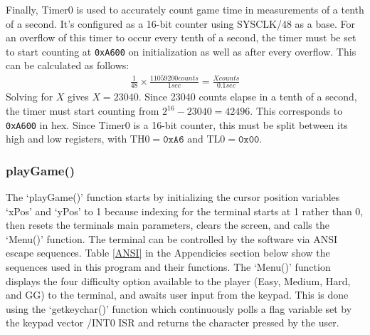 \documentclass[12pt]{article}
\begin{document}
Finally, Timer0 is used to accurately count game time in measurements of a tenth of a second. It's configured as a 16-bit counter using SYSCLK/48 as a base. For an overflow of this timer to occur every tenth of a second, the timer must be set to start counting at \texttt{0xA600} on initialization as well as after every overflow. This can be calculated as follows:
\begin{gather*}
	\frac{1}{48}\times \frac{11059200 \si{counts}}{\si{1}{sec}}=\frac{X\si{counts}}{0.1\si{sec}}
\end{gather*}
Solving for $X$ gives $X=23040$. Since 23040 counts elapse in a tenth of a second, the timer must start counting from $2^{16}-23040=42496$. This corresponds to \texttt{0xA600} in hex. Since Timer0 is a 16-bit counter, this must be split between its high and low registers, with $\mathrm{TH0}=\texttt{0xA6}$ and $\mathrm{TL0}=\texttt{0x00}$.

\subsubsection{playGame()}
The `playGame()' function starts by initializing the cursor position variables `xPos' and `yPos' to 1 because indexing for the terminal starts at 1 rather than 0, then resets the terminals main parameters, clears the screen, and calls the `Menu()' function. The terminal can be controlled by the software via ANSI escape sequences. Table \ref{ANSI} in the Appendicies section below show the sequences used in this program and their functions. The `Menu()' function displays the four difficulty option available to the player (Easy, Medium, Hard, and GG) to the terminal, and awaits user input from the keypad. This is done using the `getkeychar()' function which continuously polls a flag variable set by the keypad vector /INT0 ISR and returns the character pressed by the user.
\end{document}
